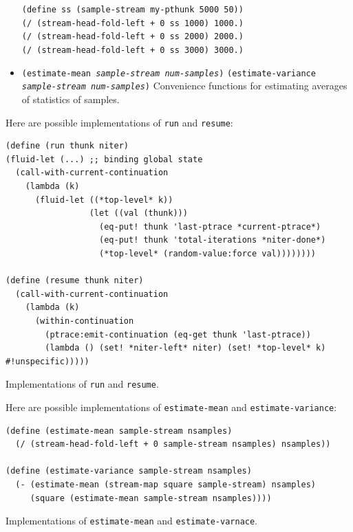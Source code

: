 \documentclass{article}
\begin{document}
\begin{itemize}
        \texttt{(define ss (sample-stream my-pthunk 5000 50))}\\
        \texttt{(/ (stream-head-fold-left + 0 ss 1000) 1000.)}\\
        \texttt{(/ (stream-head-fold-left + 0 ss 2000) 2000.)}\\
        \texttt{(/ (stream-head-fold-left + 0 ss 3000) 3000.)}
    \item[] \texttt{(estimate-mean \emph{sample-stream} \emph{num-samples})}
        \texttt{(estimate-variance \emph{sample-stream} \emph{num-samples})}
        Convenience functions for estimating averages of statistics of samples.
\end{itemize}

Here are possible implementations of \texttt{run} and \texttt{resume}:

\begin{listing}[H]
\begin{verbatim}
(define (run thunk niter)
(fluid-let (...) ;; binding global state
  (call-with-current-continuation
    (lambda (k)
      (fluid-let ((*top-level* k))
                 (let ((val (thunk)))
                   (eq-put! thunk 'last-ptrace *current-ptrace*)
                   (eq-put! thunk 'total-iterations *niter-done*)
                   (*top-level* (random-value:force val))))))))

(define (resume thunk niter)
  (call-with-current-continuation
    (lambda (k)
      (within-continuation
        (ptrace:emit-continuation (eq-get thunk 'last-ptrace))
        (lambda () (set! *niter-left* niter) (set! *top-level* k) #!unspecific)))))
\end{verbatim}
\caption{Implementations of \texttt{run} and \texttt{resume}.}
\label{listing:run-and-resume}
\end{listing}

Here are possible implementations of \texttt{estimate-mean} and \texttt{estimate-variance}:

\begin{listing}[H]
    \begin{verbatim}
(define (estimate-mean sample-stream nsamples)
  (/ (stream-head-fold-left + 0 sample-stream nsamples) nsamples))

(define (estimate-variance sample-stream nsamples)
  (- (estimate-mean (stream-map square sample-stream) nsamples)
     (square (estimate-mean sample-stream nsamples))))
    \end{verbatim}
    \caption{Implementations of \texttt{estimate-mean} and \texttt{estimate-varnace}.}
\end{listing}
\end{document}
